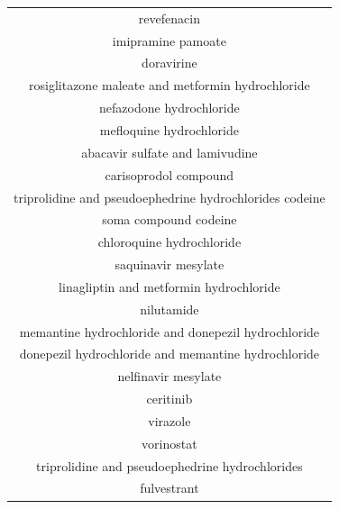 \documentclass{article}
\newcommand{\lgc}[1]{\cellcolor[gray]{0.85}#1}
\begin{document}
\begin{table}[t!]
\begin{tabular}[t]{c}
revefenacin \\
imipramine pamoate \\
doravirine \\
rosiglitazone maleate and metformin hydrochloride \\
nefazodone hydrochloride \\
\lgc{mefloquine hydrochloride\cite{Weston2020.03.25.008482}} \\
abacavir sulfate and lamivudine \\
carisoprodol compound \\
triprolidine and pseudoephedrine hydrochlorides codeine \\
soma compound codeine \\
\lgc{chloroquine hydrochloride\cite{wang2020remdesivir}} \\
\lgc{saquinavir mesylate\cite{Farag2020}} \\
linagliptin and metformin hydrochloride \\
nilutamide \\
\lgc{memantine hydrochloride and donepezil hydrochloride\cite{rejdak2020adamantanes}} \\
\lgc{donepezil hydrochloride and memantine hydrochloride\cite{rejdak2020adamantanes}} \\
\lgc{nelfinavir mesylate\cite{Xu2020.01.27.921627}} \\
ceritinib \\
\lgc{virazole\cite{khalili2020novel}} \\
vorinostat \\
triprolidine and pseudoephedrine hydrochlorides \\
fulvestrant \\
\hline
\end{tabular}
\end{table}
\end{document}
